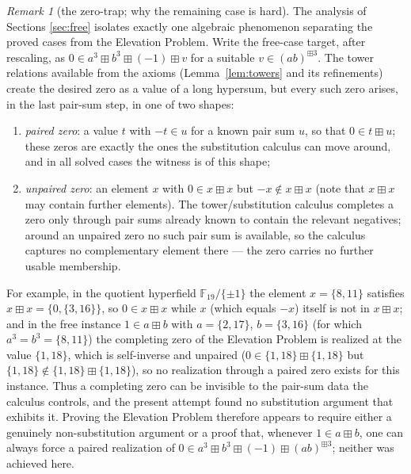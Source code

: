 \documentclass[11pt]{article}
\theoremstyle{definition}
\theoremstyle{remark}
\newtheorem{remark}[theorem]{Remark}
\newcommand{\bp}{\boxplus}
\begin{document}
\begin{remark}[the zero-trap; why the remaining case is hard]
\label{rem:zerotrap}
The analysis of Sections \ref{sec:free} isolates exactly one algebraic
phenomenon separating the proved cases from the Elevation Problem.
Write the free-case target, after rescaling, as
$0\in a^{3}\bp b^{3}\bp(-1)\bp v$ for a suitable
$v\in(ab)^{\bp3}$. The tower relations available from the axioms
(Lemma~\ref{lem:towers} and its refinements) create the desired zero as
a value of a long hypersum, but every such zero arises, in the last
pair-sum step, in one of two shapes:
\begin{enumerate}[label=\textup{(Z\arabic*)}]
\item \emph{paired zero}: a value $t$ with $-t\in u$ for a known pair
  sum $u$, so that $0\in t\bp u$; these zeros are exactly the ones the
  substitution calculus can move around, and in all solved cases the
  witness is of this shape;
\item \emph{unpaired zero}: an element $x$ with $0\in x\bp x$ but
  $-x\notin x\bp x$ (note that $x\bp x$ may contain further elements).
  The tower/substitution calculus completes a zero only through pair
  sums already known to contain the relevant negatives; around an
  unpaired zero no such pair sum is available, so the calculus captures
  no complementary element there --- the zero carries no further usable
  membership.
\end{enumerate}
For example, in the quotient hyperfield $\mathbb F_{19}/\{\pm1\}$ the
element $x=\{8,11\}$ satisfies $x\bp x=\{0,\{3,16\}\}$, so
$0\in x\bp x$ while $x$ (which equals $-x$) itself is not in
$x\bp x$; and in the free instance $1\in a\bp b$ with $a=\{2,17\}$,
$b=\{3,16\}$ (for which $a^{3}=b^{3}=\{8,11\}$) the completing zero of
the Elevation Problem is realized at the value $\{1,18\}$, which is
self-inverse and unpaired ($0\in\{1,18\}\bp\{1,18\}$ but
$\{1,18\}\notin\{1,18\}\bp\{1,18\}$), so no realization through a
paired zero exists for this instance. Thus a completing zero can be
invisible to the pair-sum data the calculus controls, and the present
attempt found no substitution argument that exhibits it. Proving the
Elevation Problem therefore appears to require either a genuinely
non-substitution argument or a proof that, whenever $1\in a\bp b$, one
can always force a paired realization of $0\in
a^{3}\bp b^{3}\bp(-1)\bp(ab)^{\bp3}$; neither was achieved here.
\end{remark}
\end{document}
